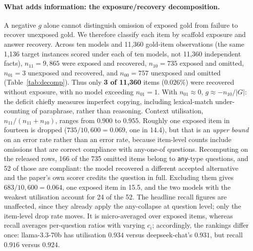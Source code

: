 \documentclass[10pt,twocolumn]{article}
\begin{document}
\paragraph{What adds information: the exposure/recovery decomposition.} A negative $g$ alone cannot distinguish omission of exposed gold from failure to recover unexposed gold. We therefore classify each item by scaffold exposure and answer recovery. Across ten models and 11{,}360 gold-item observations (the same 1{,}136 target instances scored under each of ten models, not 11{,}360 independent facts), $n_{11}=9{,}865$ were exposed and recovered, $n_{10}=735$ exposed and omitted, $n_{01}=3$ unexposed and recovered, and $n_{00}=757$ unexposed and omitted (Table~\ref{tab:decomp}). Thus only \textbf{3 of 11{,}360} items ($0.026\%$) were recovered without exposure, with no model exceeding $n_{01}=1$. With $n_{01}\approx0$, $g\approx-n_{10}/|G|$: the deficit chiefly measures imperfect copying, including lexical-match under-counting of paraphrase, rather than reasoning. Context utilisation, $n_{11}/(n_{11}+n_{10})$, ranges from $0.900$ to $0.955$. Roughly one exposed item in fourteen is dropped ($735/10{,}600=0.069$, one in 14.4), but that is an \emph{upper bound} on an error rate rather than an error rate, because item-level counts include omissions that are correct compliance with any-one-of questions. Recomputing on the released rows, 166 of the 735 omitted items belong to \texttt{any}-type questions, and 52 of those are compliant: the model recovered a different accepted alternative and the paper's own scorer credits the question in full. Excluding them gives $683/10{,}600=0.064$, one exposed item in 15.5, and the two models with the weakest utilisation account for 24 of the 52. The headline recall figures are unaffected, since they already apply the any-collapse at question level; only the item-level drop rate moves. It is micro-averaged over exposed items, whereas recall averages per-question ratios with varying $c_i$; accordingly, the rankings differ once: llama-3.3-70b has utilisation $0.934$ versus deepseek-chat's $0.931$, but recall $0.916$ versus $0.924$.
\end{document}

